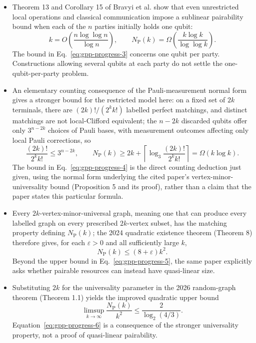 \begin{itemize}
  \item Theorem 13 and Corollary 15 of Bravyi et al. show that even unrestricted local operations and classical communication impose a sublinear pairability bound when each of the $n$ parties initially holds one qubit:
  \begin{equation}
k=O\!\left(\frac{n\log\log n}{\log n}\right),
  \qquad
  N_{\mathrm P}(k)=\Omega\!\left(\frac{k\log k}{\log\log k}\right).
\label{eq:gpp-progress-3}
\end{equation}
  The bound in Eq.~\eqref{eq:gpp-progress-3} concerns one qubit per party. Constructions allowing several qubits at each party do not settle the one-qubit-per-party problem. 

  \item An elementary counting consequence of the Pauli-measurement normal form gives a stronger bound for the restricted model here: on a fixed set of $2k$ terminals, there are $(2k)!/(2^k k!)$ labelled perfect matchings, and distinct matchings are not local-Clifford equivalent; the $n-2k$ discarded qubits offer only $3^{n-2k}$ choices of Pauli bases, with measurement outcomes affecting only local Pauli corrections, so
  \begin{equation}
\frac{(2k)!}{2^k k!}\leq3^{n-2k},
  \qquad
  N_{\mathrm P}(k)\geq
  2k+\left\lceil\log_3\frac{(2k)!}{2^k k!}\right\rceil
  =\Omega(k\log k).
\label{eq:gpp-progress-4}
\end{equation}
  The bound in Eq.~\eqref{eq:gpp-progress-4} is the direct counting deduction just given, using the normal form underlying the cited paper's vertex-minor-universality bound (Proposition 5 and its proof), rather than a claim that the paper states this particular formula. 

  \item Every $2k$-vertex-minor-universal graph, meaning one that can produce every labelled graph on every prescribed $2k$-vertex subset, has the matching property defining $N_{\mathrm P}(k)$; the 2024 quadratic existence theorem (Theorem 8) therefore gives, for each $\varepsilon>0$ and all sufficiently large $k$,
  \begin{equation}
N_{\mathrm P}(k)\leq(8+\varepsilon)k^2.
\label{eq:gpp-progress-5}
\end{equation}
  Beyond the upper bound in Eq.~\eqref{eq:gpp-progress-5}, the same paper explicitly asks whether pairable resources can instead have quasi-linear size. 

  \item Substituting $2k$ for the universality parameter in the 2026 random-graph theorem (Theorem 1.1) yields the improved quadratic upper bound
  \begin{equation}
\limsup_{k\to\infty}\frac{N_{\mathrm P}(k)}{k^2}
  \leq\frac{2}{\log_2(4/3)}.
\label{eq:gpp-progress-6}
\end{equation}
  Equation~\eqref{eq:gpp-progress-6} is a consequence of the stronger universality property, not a proof of quasi-linear pairability. 
\end{itemize}

